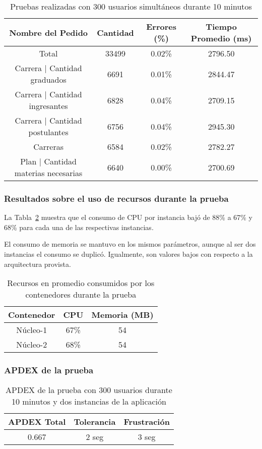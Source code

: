 \begin{table}[!htbp]
    \centering
    \makegapedcells
    \begin{tabular}{|c|c|c|c|}
    \hline
    Nombre del Pedido & Cantidad & Errores (\%) & Tiempo Promedio (ms) \\ \hline
    Total & 33499 & 0.02\% & 2796.50\\ \hline
    Carrera | Cantidad graduados & 6691 & 0.01\% & 2844.47\\ \hline
    Carrera | Cantidad ingresantes & 6828 & 0.04\% & 2709.15\\ \hline
    Carrera | Cantidad postulantes & 6756 & 0.04\% & 2945.30\\ \hline
    Carreras & 6584 & 0.02\% & 2782.27\\ \hline
    Plan | Cantidad materias necesarias & 6640 & 0.00\% & 2700.69\\ \hline
    \end{tabular}
    \caption{Pruebas realizadas con 300 usuarios simultáneos durante 10 minutos}
    \label{tab:300u_10m_2i_gen}
\end{table}



\subsubsection{Resultados sobre el uso de recursos durante la prueba}

La Tabla~\ref{tab:300u_10m_2i_rec} muestra que el consumo de CPU por instancia bajó de 88\% a 67\% y 68\% para cada una de las respectivas instancias. 

El consumo de memoria se mantuvo en los mismos parámetros, aunque al ser dos instancias el consumo se duplicó. Igualmente, son valores bajos con respecto a la arquitectura provista.
\begin{table}[!htbp]
    \centering
    \makegapedcells
    \begin{tabular}{|c|c|c|}
    \hline
    Contenedor & CPU & Memoria (MB)\\ \hline
    Núcleo-1 & 67\% & 54 \\ \hline
    Núcleo-2 & 68\% & 54 \\ \hline
    \end{tabular}
    \caption{Recursos en promedio consumidos por los contenedores durante la prueba}
    \label{tab:300u_10m_2i_rec}
\end{table}
\subsubsection{APDEX de la prueba}
\begin{table}[!htbp]
    \centering
    \makegapedcells
    \begin{tabular}{|c|c|c|}
    \hline
    APDEX Total & Tolerancia & Frustración\\ \hline
    0.667 & 2 seg & 3 seg \\ \hline
    \end{tabular}
    \caption{APDEX de la prueba con 300 usuarios durante 10 minutos y dos instancias de la aplicación}
    \label{tab:300u_10m_2i_apdex}
\end{table}
\break

